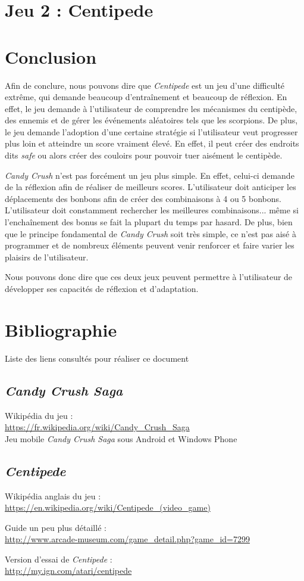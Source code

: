 \documentclass[a4paper, 12pt, oneside]{article}
\newcommand{\oeuvre}[1]{\textit{#1}}
\newcommand{\Candy}{\oeuvre{Candy Crush}\xspace} %
\newcommand{\CandyS}{\oeuvre{Candy Crush Saga}\xspace}
\newcommand{\Centi}{\oeuvre{Centipede}\xspace}
\newcommand{\lien}[2]{\noindent #1 :\\{\small\url{#2}}}
\begin{document}
\section{Jeu 2 : Centipede}

\newpage
\section{Conclusion}
Afin de conclure, nous pouvons dire que \Centi est un jeu d'une difficulté extrême, qui demande beaucoup d'entraînement et beaucoup de réflexion. En effet, le jeu demande à l'utilisateur de comprendre les mécanismes du centipède, des ennemis et de gérer les événements aléatoires tels que les scorpions. De plus, le jeu demande l'adoption d'une certaine stratégie si l'utilisateur veut progresser plus loin et atteindre un score vraiment élevé. En effet, il peut créer des endroits dits \emph{safe} ou alors créer des couloirs pour pouvoir tuer aisément le centipède.

\Candy n'est pas forcément un jeu plus simple. En effet, celui-ci demande de la réflexion afin de réaliser de meilleurs scores. L'utilisateur doit anticiper les déplacements des bonbons afin de créer des combinaisons à 4 ou 5 bonbons.  L'utilisateur doit constamment rechercher les meilleures combinaisons... même si l'enchaînement des bonus se fait la plupart du temps par hasard. De plus, bien que le principe fondamental de \Candy soit très simple, ce n'est pas aisé à programmer et de nombreux éléments peuvent venir renforcer et faire varier les plaisirs de l'utilisateur. 

Nous pouvons donc dire que ces deux jeux peuvent permettre à l'utilisateur de développer ses capacités de réflexion et d'adaptation.

\newpage
\section{Bibliographie}
Liste des liens consultés pour réaliser ce document

\subsection*{\CandyS}
\lien{Wikipédia du jeu}{https://fr.wikipedia.org/wiki/Candy\_Crush\_Saga}\\
Jeu mobile \CandyS sous Android et Windows Phone

\subsection*{\Centi}
\lien{Wikipédia anglais du jeu}{https://en.wikipedia.org/wiki/Centipede\_(video\_game)}

\lien{Guide un peu plus détaillé}{http://www.arcade-museum.com/game\_detail.php?game\_id=7299}

\lien{Version d'essai de \Centi}{http://my.ign.com/atari/centipede}
\end{document}
